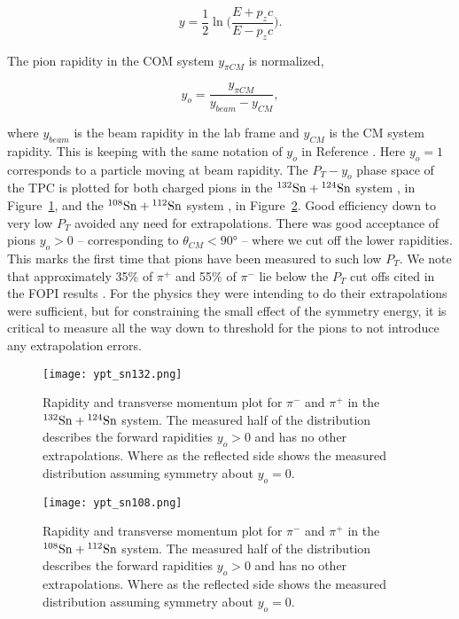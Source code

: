 \begin{equation}
y = \frac{1}{2} \ln\Big( \frac{E + p_zc}{E - p_zc}\Big).
\end{equation}

The pion rapidity in the COM system $y_{\pi CM}$ is normalized,

\begin{equation}
y_o = \frac{y_{\pi CM}}{y_{beam} - y_{CM}},
\end{equation}

where $y_{beam}$ is the beam rapidity in the lab frame and $y_{CM}$ is the CM system rapidity. This is keeping with the same notation of $y_o$ in Reference \cite{fopi}. Here $y_o = 1$ corresponds to a particle moving at beam rapidity. The   $P_T - y_o$ phase space of the \spirit TPC is plotted for both charged pions in the ${}^{132}\mathrm{Sn} + {}^{124}\mathrm{Sn}$ system , in Figure~\ref{fig:ptrap_sn132}, and the ${}^{108}\mathrm{Sn} + {}^{112}\mathrm{Sn}$ system , in Figure~\ref{fig:ptrap_sn108}. Good efficiency down to very low $P_T$ avoided any need for extrapolations. There was good acceptance of pions $y_o > 0$ -- corresponding to $\theta_{CM} < \ang{90}$ -- where we cut off the lower rapidities. This marks the first time that pions have been measured to such low $P_T$. We note that approximately 35\% of $\pi^+$ and 55\% of $\pi^-$ lie below the $P_T$ cut offs cited in the FOPI results \cite{fopi}. For the physics they were intending to do their extrapolations were sufficient, but for constraining the small effect of the symmetry energy, it is critical to measure all the way down to threshold for the pions to not introduce any extrapolation errors.

\begin{figure}[!htb]
\centering
\texttt{[image: ypt\_sn132.png]}
\caption{Rapidity and transverse momentum plot for $\pi^-$ and $\pi^+$ in the ${}^{132}\mathrm{Sn} + {}^{124}\mathrm{Sn}$ system. The measured half of the distribution describes the forward rapidities $y_o > 0$ and has no other extrapolations. Where as the reflected side shows the measured distribution assuming symmetry about $y_o = 0$.}
\label{fig:ptrap_sn132}
\end{figure}


\begin{figure}[!htb]
\centering
\texttt{[image: ypt\_sn108.png]}
\caption{Rapidity and transverse momentum plot for $\pi^-$ and $\pi^+$ in the ${}^{108}\mathrm{Sn} + {}^{112}\mathrm{Sn}$ system. The measured half of the distribution describes the forward rapidities $y_o > 0$ and has no other extrapolations. Where as the reflected side shows the measured distribution assuming symmetry about $y_o = 0$.}
\label{fig:ptrap_sn108}
\end{figure}

